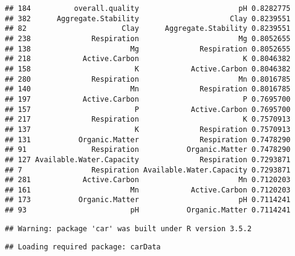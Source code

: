 \documentclass[]{article}
\newenvironment{Shaded}{\begin{snugshade}}{\end{snugshade}}
\newcommand{\KeywordTok}[1]{\textcolor[rgb]{0.13,0.29,0.53}{\textbf{#1}}}
\newcommand{\StringTok}[1]{\textcolor[rgb]{0.31,0.60,0.02}{#1}}
\newcommand{\OperatorTok}[1]{\textcolor[rgb]{0.81,0.36,0.00}{\textbf{#1}}}
\newcommand{\NormalTok}[1]{#1}
\begin{document}
\begin{verbatim}
## 184          overall.quality                       pH 0.8282775
## 382      Aggregate.Stability                     Clay 0.8239551
## 82                      Clay      Aggregate.Stability 0.8239551
## 238              Respiration                       Mg 0.8052655
## 138                       Mg              Respiration 0.8052655
## 218            Active.Carbon                        K 0.8046382
## 158                        K            Active.Carbon 0.8046382
## 280              Respiration                       Mn 0.8016785
## 140                       Mn              Respiration 0.8016785
## 197            Active.Carbon                        P 0.7695700
## 157                        P            Active.Carbon 0.7695700
## 217              Respiration                        K 0.7570913
## 137                        K              Respiration 0.7570913
## 131           Organic.Matter              Respiration 0.7478290
## 91               Respiration           Organic.Matter 0.7478290
## 127 Available.Water.Capacity              Respiration 0.7293871
## 7                Respiration Available.Water.Capacity 0.7293871
## 281            Active.Carbon                       Mn 0.7120203
## 161                       Mn            Active.Carbon 0.7120203
## 173           Organic.Matter                       pH 0.7114241
## 93                        pH           Organic.Matter 0.7114241
\end{verbatim}

\begin{Shaded}
\end{Shaded}

\begin{verbatim}
## Warning: package 'car' was built under R version 3.5.2
\end{verbatim}

\begin{verbatim}
## Loading required package: carData
\end{verbatim}
\end{document}
